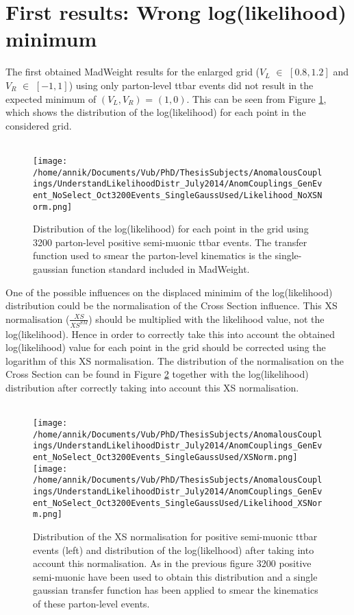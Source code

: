 \section{First results: Wrong log(likelihood) minimum}

The first obtained MadWeight results for the enlarged grid ($V_L$ $\in$ $[0.8,1.2]$ and $V_R$ $\in$ $[-1,1]$) using only parton-level ttbar events did not result in the expected minimum of $(V_L,V_R)$ = $(1, 0)$. This can be seen from Figure \ref{fig::Likelihood}, which shows the distribution of the log(likelihood) for each point in the considered grid.\\ \\
\begin{figure}[!h]
 \centering
 \texttt{[image: /home/annik/Documents/Vub/PhD/ThesisSubjects/AnomalousCouplings/UnderstandLikelihoodDistr\_July2014/AnomCouplings\_GenEvent\_NoSelect\_Oct3200Events\_SingleGaussUsed/Likelihood\_NoXSNorm.png]}
 \caption{Distribution of the log(likelihood) for each point in the grid using 3200 parton-level positive semi-muonic ttbar events. The transfer function used to smear the parton-level kinematics is the single-gaussian function standard included in MadWeight.}
 \label{fig::Likelihood}
\end{figure}
One of the possible influences on the displaced minimim of the log(likelihood) distribution could be the normalisation of the Cross Section influence. This XS normalisation ($\frac{XS}{XS^{SM}}$) should be multiplied with the likelihood value, not the log(likelihood). Hence in order to correctly take this into account the obtained log(likelihood) value for each point in the grid should be corrected using the logarithm of this XS normalisation. The distribution of the normalisation on the Cross Section can be found in Figure \ref{fig::XSandLikelihoodNorm} together with the log(likelihood) distribution after correctly taking into account this XS normalisation.\\ \\
\begin{figure}[!h]
 \texttt{[image: /home/annik/Documents/Vub/PhD/ThesisSubjects/AnomalousCouplings/UnderstandLikelihoodDistr\_July2014/AnomCouplings\_GenEvent\_NoSelect\_Oct3200Events\_SingleGaussUsed/XSNorm.png]}
 \texttt{[image: /home/annik/Documents/Vub/PhD/ThesisSubjects/AnomalousCouplings/UnderstandLikelihoodDistr\_July2014/AnomCouplings\_GenEvent\_NoSelect\_Oct3200Events\_SingleGaussUsed/Likelihood\_XSNorm.png]}
 \caption{Distribution of the XS normalisation for positive semi-muonic ttbar events (left) and distribution of the log(likelhood) after taking into account this normalisation. As in the previous figure 3200 positive semi-muonic have been used to obtain this distribution and a single gaussian transfer function has been applied to smear the kinematics of these parton-level events.}
 \label{fig::XSandLikelihoodNorm}
\end{figure}
